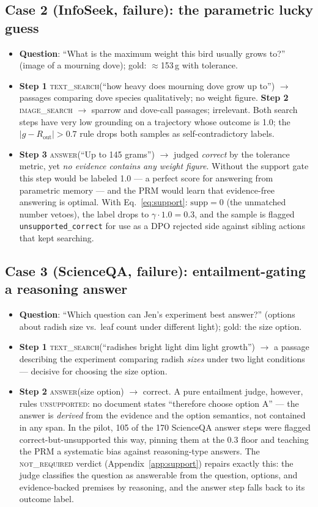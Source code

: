 \documentclass[letterpaper,twocolumn,10pt]{article}
\begin{document}
\subsection*{Case 2 (InfoSeek, failure): the parametric lucky guess}
\begin{itemize}
\item \textbf{Question}: ``What is the maximum weight this bird usually
grows to?'' (image of a mourning dove); gold: $\approx$153\,g with
tolerance.
\item \textbf{Step 1} \textsc{text\_search}(``how heavy does mourning dove
grow up to'') $\to$ passages comparing dove species qualitatively; no
weight figure. \textbf{Step 2} \textsc{image\_search} $\to$ sparrow and
dove-call passages; irrelevant. Both search steps have very low grounding
on a trajectory whose outcome is 1.0; the
$|g - R_\mathrm{out}| > 0.7$ rule drops both samples as
self-contradictory labels.
\item \textbf{Step 3} \textsc{answer}(``Up to 145 grams'') $\to$ judged
\emph{correct} by the tolerance metric, yet \emph{no evidence contains any
weight figure}. Without the support gate this step would be labeled 1.0
--- a perfect score for answering from parametric memory --- and the PRM
would learn that evidence-free answering is optimal. With
Eq.~\eqref{eq:support}: $\mathrm{supp}{=}0$ (the unmatched number vetoes),
the label drops to $\gamma \cdot 1.0 = 0.3$, and the sample is flagged
\texttt{unsupported\_correct} for use as a DPO rejected side against
sibling actions that kept searching.
\end{itemize}

\subsection*{Case 3 (ScienceQA, failure): entailment-gating a reasoning answer}
\begin{itemize}
\item \textbf{Question}: ``Which question can Jen's experiment best
answer?'' (options about radish size vs.\ leaf count under different
light); gold: the size option.
\item \textbf{Step 1} \textsc{text\_search}(``radishes bright light dim
light growth'') $\to$ a passage describing the experiment comparing radish
\emph{sizes} under two light conditions --- decisive for choosing the
size option.
\item \textbf{Step 2} \textsc{answer}(size option) $\to$ correct. A pure
entailment judge, however, rules \textsc{unsupported}: no document states
``therefore choose option A'' --- the answer is \emph{derived} from the
evidence and the option semantics, not contained in any span. In the
pilot, 105 of the 170 ScienceQA answer steps were flagged
correct-but-unsupported this way,
pinning them at the 0.3 floor and teaching the PRM a systematic bias
against reasoning-type answers. The \textsc{not\_required} verdict
(Appendix~\ref{app:support}) repairs exactly this: the judge classifies
the question as answerable from the question, options, and evidence-backed
premises by reasoning, and the answer step falls back to its outcome
label.
\end{itemize}
\end{document}
